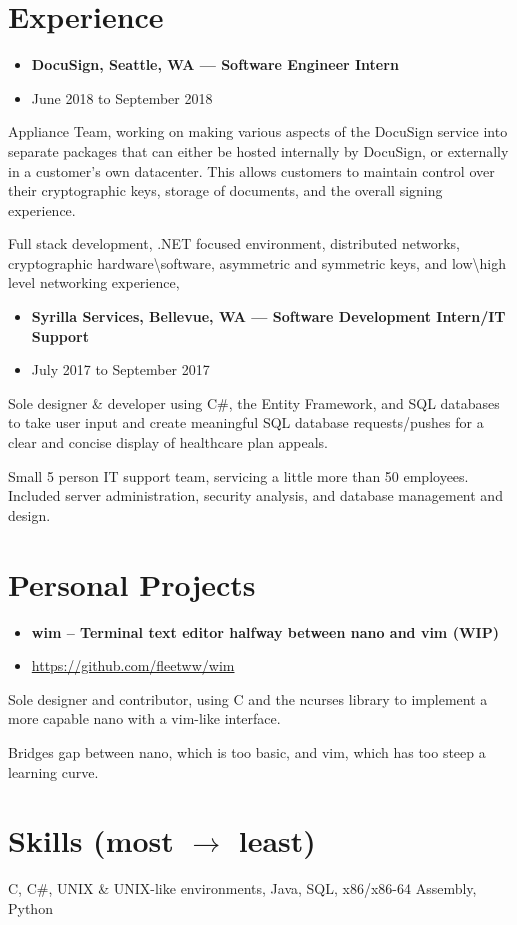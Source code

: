 \documentclass{article}
\newcommand{\ExpItem}[1]{\item #1}
\newcommand{\Workplace}[1]{#1}
\newcommand{\JobTitle}[1]{#1}
\newcommand{\Location}[1]{#1}
\newcommand{\StartDate}[1]{#1}
\newcommand{\EndDate}[1]{#1}
\newcommand{\Experience}[5]{
  \begin{itemize}[leftmargin=.125cm]
  		\item[] {\textbf{\large #1, #3 --- #2}} \item[] {\large #4 to #5}
  \end{itemize}
}
\newcommand{\startexpitems}{
\begin{itemize}[leftmargin=.6cm]
}
\newcommand{\closeexpitems}{
\end{itemize}
}
\newcommand{\ProjectTitle}[1]{#1}
\newcommand{\ProjectShortDesc}[1]{#1}
\newcommand{\ProjectLink}[1]{\url{#1}}
\newcommand{\Project}[3]{
	\begin{itemize}[leftmargin=.125cm]
		\item[] {\textbf{\large #1 -- #2}} \item[] #3
	\end{itemize}
}
\begin{document}
\section*{Experience}
\Experience
    {\Workplace{DocuSign}}
    {\JobTitle{Software Engineer Intern}}
    {\Location{Seattle, WA}}
    {\StartDate{June 2018}}
    {\EndDate{September 2018}}
\startexpitems
    {\ExpItem{Appliance Team, working on making various aspects of the DocuSign service into separate packages that can either be hosted internally by DocuSign, or externally in a customer's own datacenter. This allows customers to maintain control over their cryptographic keys, storage of documents, and the overall signing experience.}}
    {\ExpItem{Full stack development, .NET focused environment, distributed networks, cryptographic hardware\textbackslash software, asymmetric and symmetric keys, and low\textbackslash high level networking experience,}}
\closeexpitems
\Experience
	{\Workplace{Syrilla Services}}
	{\JobTitle{Software Development Intern/IT Support}}
	{\Location{Bellevue, WA}}
	{\StartDate{July 2017}}
	{\EndDate{September 2017}}
\startexpitems
	{\ExpItem{Sole designer \& developer using C\#, the Entity Framework, and SQL databases to take user input and create meaningful SQL database requests/pushes for a clear and concise display of healthcare plan appeals.}}
	{\ExpItem{Small 5 person IT support team, servicing a little more than 50 employees. Included server administration, security analysis, and database management and design.}}
\closeexpitems

\section*{Personal Projects}
\Project
	{\ProjectTitle{wim}}
	{\ProjectShortDesc{Terminal text editor halfway between nano and vim (WIP)}}
	{\ProjectLink{https://github.com/fleetww/wim}}
\startexpitems
	{\ExpItem{Sole designer and contributor, using C and the ncurses library to implement a more capable nano with a vim-like interface.}}
	{\ExpItem{Bridges gap between nano, which is too basic, and vim, which has too steep a learning curve.}}
\closeexpitems

\section*{Skills (most $\rightarrow$ least)}
C, C\#, UNIX \& UNIX-like environments, Java, SQL, x86/x86-64 Assembly, Python
\end{document}
